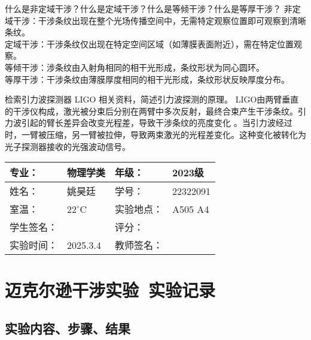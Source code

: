 \documentclass[dvipsnames, svgnames,a4paper,11pt]{article}
\newcommand{\exname}{迈克尔逊干涉实验}%
\begin{document}
\begin{question}
    什么是非定域干涉？什么是定域干涉？什么是等倾干涉？什么是等厚干涉？
	\tcblower
	非定域干涉：干涉条纹出现在整个光场传播空间中，无需特定观察位置即可观察到清晰条纹。\\
	定域干涉：干涉条纹仅出现在特定空间区域（如薄膜表面附近），需在特定位置观察。\\
	等倾干涉：涉条纹由入射角相同的相干光形成，条纹形状为同心圆环。\\
	等厚干涉：干涉条纹由薄膜厚度相同的相干光形成，条纹形状反映厚度分布。
\end{question}

\begin{question}
    检索引力波探测器 LIGO 相关资料，简述引力波探测的原理。
	\tcblower
	LIGO由两臂垂直的干涉仪构成，激光被分束后分别在两臂中多次反射，最终合束产生干涉条纹。引力波引起的臂长差异会改变光程差，导致干涉条纹的亮度变化
	。当引力波经过时，一臂被压缩，另一臂被拉伸，导致两束激光的光程差变化。这种变化被转化为光子探测器接收的光强波动信号。
\end{question}
\clearpage
{}
\begin{table}
	\renewcommand\arraystretch{1.7}
	\centering
	\begin{tabularx}{\textwidth}{|X|X|X|X|}
	\hline
	专业：& 物理学类 &年级：& 2023级 \\
	\hline
	姓名： &姚昊廷& 学号：&22322091  \\
	\hline
	室温：&$22^\circ$C&实验地点：&A505  A4\\
	\hline
	学生签名：& & 评分： &\\
	\hline
	实验时间：& 2025.3.4& 教师签名：&\\
	\hline
	\end{tabularx}
\end{table}
\section{\exname\ \textbf{实验记录}}
\subsection{实验内容、步骤、结果}
\end{document}
